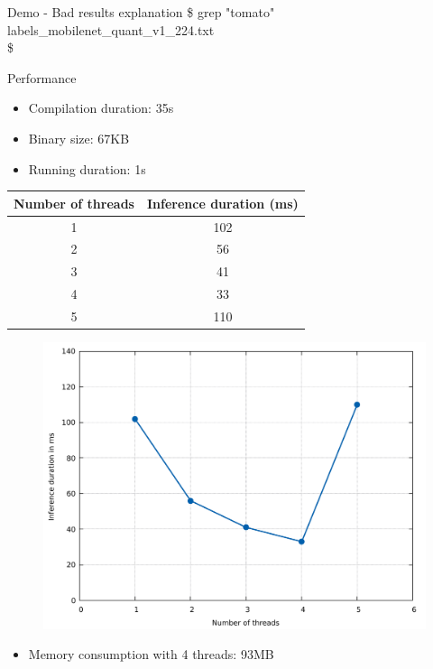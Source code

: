 \begin{frame}{Demo - Bad results explanation}
  \ttfamily \$ grep "tomato" labels\_mobilenet\_quant\_v1\_224.txt \\
  \ttfamily \$
\end{frame}

\begin{frame}{Performance}
  \begin{itemize}
	\item Compilation duration: 35s
	\item Binary size: 67KB
	\item Running duration: 1s
  \end{itemize}
  \begin{table}
    {\tiny
	\begin{tabular}{|c|c|}
	  \hline
		\textbf{Number of threads} & \textbf{Inference duration (ms)} \\
	  \hline
		1 & 102 \\
	  \hline
		2 & 56 \\
	  \hline
		3 & 41 \\
	  \hline
		4 & 33 \\
	  \hline
		5 & 110 \\
	  \hline
	\end{tabular}
	}
  \end{table}
  \begin{figure}
	\includegraphics[width=\linewidth,height=0.45\textheight,keepaspectratio]{images/inference_duration.pdf}
  \end{figure}
  \begin{itemize}
	\item Memory consumption with 4 threads: 93MB
  \end{itemize}
\end{frame}

